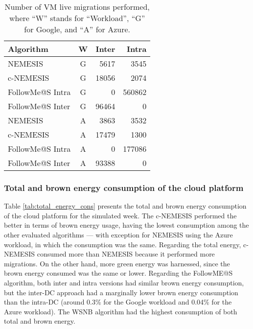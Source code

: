 \begin{table}[!ht]
\caption{Number of VM live migrations performed, where ``W'' stands for ``Workload'', ``G'' for Google, and ``A'' for Azure. }\label{tab:amount_migs} \centering
\begin{tabular}{|l|c|r|r|}
  \hline
  \textbf{Algorithm} & \textbf{W}  & \textbf{Inter} & \textbf{Intra}   \\
  \hline
  NEMESIS  & G & 5617  & 3545 \\
  \hline
  c-NEMESIS & G & 18056  & 2074 \\
  \hline
  FollowMe@S Intra  & G & 0  & 560862 \\
  \hline
  FollowMe@S Inter  & G & 96464 & 0 \\
  \hline
  NEMESIS & A & 3863 & 3532 \\
  \hline
  c-NEMESIS & A & 17479  & 1300 \\
  \hline
  FollowMe@S Intra  & A & 0  & 177086 \\
  \hline
  FollowMe@S Inter   & A & 93388 & 0 \\
  \hline
\end{tabular}
\end{table}

\subsubsection{Total and brown energy consumption of the cloud platform}

Table \ref{tab:total_energy_cons} presents the total and brown energy consumption of the cloud platform for the simulated week. 
The c-NEMESIS performed the better in terms of brown energy usage, having the lowest consumption among the other evaluated algorithms --- 
with exception for NEMESIS using the Azure workload, in which the
consumption was the same. Regarding the total energy, c-NEMESIS
consumed more than NEMESIS because it performed more
migrations. On the other hand, more green energy was harnessed, since the brown
energy consumed was the same or lower. Regarding the FollowME@S
algorithm, both inter and intra versions had similar
brown energy consumption, but the inter-DC approach
had a marginally lower brown energy consumption than the intra-DC (around 0.3\% for the Google workload and 0.04\% for the Azure workload). The WSNB algorithm had the highest consumption of both total and brown energy.

